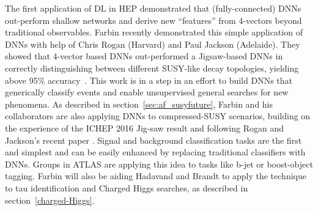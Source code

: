 
The first application of DL in HEP demonstrated that (fully-connected)
DNNs out-perform shallow networks and derive new ``features'' from
4-vectors beyond traditional observables. Farbin recently demonstrated
this simple application of DNNs with help of Chris Rogan (Harvard) and
Paul Jackson (Adelaide). They showed that 4-vector based DNNs
out-performed a Jigsaw-based DNNs in correctly distinguishing between
different SUSY-like decay topologies, yielding above 95\%
accuracy~\cite{HarvardDL}. This work is in a step in an effort to
build DNNs that generically classify events and enable unsupervised
general searches for new phenomena. As described in section~\ref{sec:af_susyfuture},
Farbin and his collaborators are also applying DNNs to compressed-SUSY
scenarios, building on the experience of the ICHEP 2016 Jig-saw result
and following Rogan and Jackson's recent
paper \cite{Jackson:2016mfb}. Signal and background classification
tasks are the first and simplest and can be easily enhanced by
replacing traditional classifiers with DNNs. Groups in ATLAS are
applying this idea to tasks like b-jet or boost-object tagging. Farbin
will also be aiding Hadavand and Brandt to apply the technique to tau
identification and Charged Higgs searches, as described in
section~\ref{charged-Higgs}.



